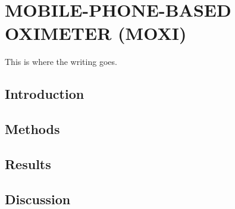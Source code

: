 
\chapter{MOBILE-PHONE-BASED OXIMETER (MOXI)} %
\label{chap:moxi}
This is where the writing goes. 


\section{Introduction} %
\label{chap:moxi:introduction}



\section{Methods}
\label{chap:moxi:methods}



\section{Results}
\label{chap:moxi:results}



\section{Discussion}
\label{chap:moxi:discussion}




